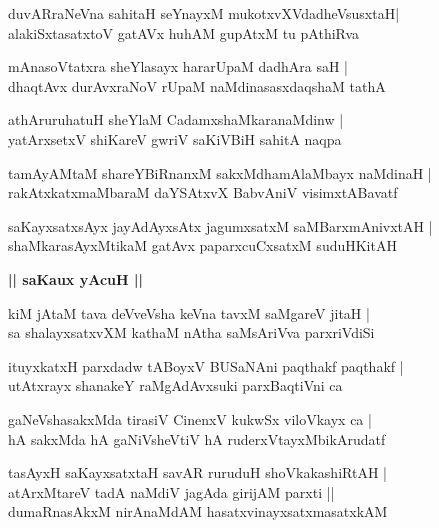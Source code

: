 \documentclass[twoside,12pt,openright]{book}
\newcounter{shloka}[chapter]
\def\uvaca#1{\centerline{{\large\textbf{#1}}}}
\begin{document}
\begin{shloka}%
duvARraNeVna sahitaH seYnayxM mukotxvXVdadheVsusxtaH|\\
alakiSxtasatxtoV gatAVx huhAM gupAtxM tu pAthiRva 
\end{shloka}

\begin{shloka}%
mAnasoVtatxra sheYlasayx hararUpaM dadhAra saH |\\
dhaqtAvx durAvxraNoV rUpaM naMdinasasxdaqshaM tathA 
\end{shloka}

\begin{shloka}%
athAruruhatuH sheYlaM CadamxshaMkaranaMdinw |\\
yatArxsetxV shiKareV gwriV saKiVBiH sahitA naqpa
\end{shloka}

\begin{shloka}%
tamAyAMtaM shareYBiRnanxM sakxMdhamAlaMbayx naMdinaH |\\
rakAtxkatxmaMbaraM daYSAtxvX BabvAniV visimxtABavatf
\end{shloka}

\begin{shloka}%
saKayxsatxsAyx jayAdAyxsAtx jagumxsatxM saMBarxmAnivxtAH |\\
shaMkarasAyxMtikaM gatAvx paparxcuCxsatxM suduHKitAH 
\end{shloka}

\uvaca{|| saKaux yAcuH ||}

\begin{shloka}%
kiM jAtaM tava deVveVsha keVna tavxM saMgareV jitaH |\\
sa shalayxsatxvXM kathaM nAtha saMsAriVva parxriVdiSi
\end{shloka}

\begin{shloka}%
ituyxkatxH parxdadw tABoyxV BUSaNAni paqthakf paqthakf |\\
utAtxrayx shanakeY raMgAdAvxsuki parxBaqtiVni ca 
\end{shloka}

\begin{shloka}%
gaNeVshasakxMda tirasiV CinenxV kukwSx viloVkayx ca |\\
hA sakxMda hA gaNiVsheVtiV hA ruderxVtayxMbikArudatf 
\end{shloka}

\begin{shloka}%
tasAyxH saKayxsatxtaH savAR ruruduH shoVkakashiRtAH |\\
atArxMtareV tadA naMdiV jagAda girijAM parxti ||\\
dumaRnasAkxM nirAnaMdAM hasatxvinayxsatxmasatxkAM 
\end{shloka}
\end{document}
